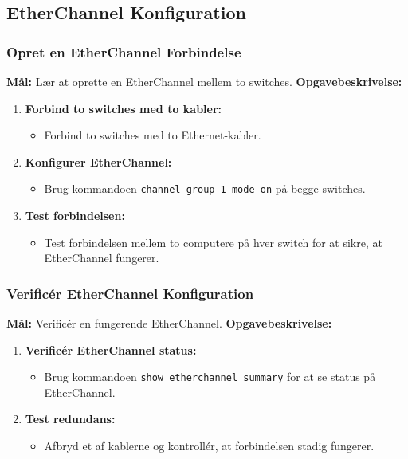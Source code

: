 \subsection{EtherChannel Konfiguration}
\subsubsection*{Opret en EtherChannel Forbindelse}
\textbf{Mål:} Lær at oprette en EtherChannel mellem to switches.
\newline\newline\noindent
\textbf{Opgavebeskrivelse:}
\begin{enumerate}
	\item \textbf{Forbind to switches med to kabler:}
	\begin{itemize}
		\item Forbind to switches med to Ethernet-kabler.
	\end{itemize}
	\item \textbf{Konfigurer EtherChannel:}
	\begin{itemize}
		\item Brug kommandoen \texttt{channel-group 1 mode on} på begge switches.
	\end{itemize}
	\item \textbf{Test forbindelsen:}
	\begin{itemize}
		\item Test forbindelsen mellem to computere på hver switch for at sikre, at EtherChannel fungerer.
	\end{itemize}
\end{enumerate}

\subsubsection*{Verificér EtherChannel Konfiguration}
\textbf{Mål:} Verificér en fungerende EtherChannel.
\newline\newline\noindent
\textbf{Opgavebeskrivelse:}
\begin{enumerate}
	\item \textbf{Verificér EtherChannel status:}
	\begin{itemize}
		\item Brug kommandoen \texttt{show etherchannel summary} for at se status på EtherChannel.
	\end{itemize}
	\item \textbf{Test redundans:}
	\begin{itemize}
		\item Afbryd et af kablerne og kontrollér, at forbindelsen stadig fungerer.
	\end{itemize}
\end{enumerate}


